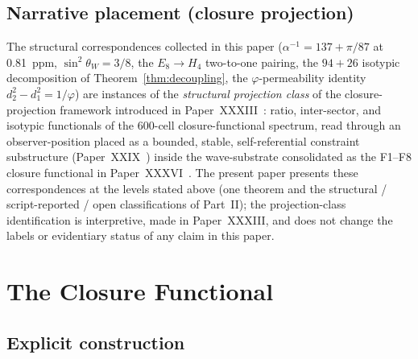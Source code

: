\documentclass[12pt]{article}
\begin{document}
\subsection*{Narrative placement (closure projection)}

The structural correspondences collected in this paper ($\alpha^{-1} = 137 + \pi/87$ at 0.81~ppm, $\sin^2\theta_W = 3/8$, the $E_8 \to H_4$ two-to-one pairing, the $94+26$ isotypic decomposition of Theorem~\ref{thm:decoupling}, the $\varphi$-permeability identity $d_2^2 - d_1^2 = 1/\varphi$) are instances of the \textit{structural projection class} of the closure-projection framework introduced in Paper~XXXIII~\citep{SmartXXXIII}: ratio, inter-sector, and isotypic functionals of the 600-cell closure-functional spectrum, read through an observer-position placed as a bounded, stable, self-referential constraint substructure (Paper~XXIX~\citep{SmartXXIX}) inside the wave-substrate consolidated as the F1--F8 closure functional in Paper~XXXVI~\citep{SmartXXXVI}. The present paper presents these correspondences at the levels stated above (one theorem and the structural / script-reported / open classifications of Part~II); the projection-class identification is interpretive, made in Paper~XXXIII, and does not change the labels or evidentiary status of any claim in this paper.

\section{The Closure Functional}\label{sec:F}

\subsection{Explicit construction}
\end{document}

